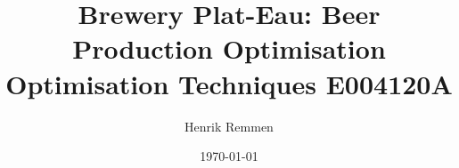 \documentclass[pdftex,10pt,a4paper]{article}
\numberwithin{equation}{section}
\numberwithin{figure}{section}
\numberwithin{table}{section}
\begin{document}
\pagestyle{empty}

\title{\textbf{Brewery Plat-Eau: Beer Production Optimisation}\\
Optimisation Techniques 
E004120A}

\author{Henrik Remmen}
\date{\today}

\maketitle

\newpage
\tableofcontents

\newpage
{}
\setcounter{page}{1}
\pagestyle{fancy}


\FloatBarrier
\newpage


\FloatBarrier
\newpage


\FloatBarrier
\newpage


\FloatBarrier
\newpage


\FloatBarrier
\newpage


\FloatBarrier
\newpage


\FloatBarrier
\newpage


\FloatBarrier
\newpage


\FloatBarrier
\newpage


\FloatBarrier
\newpage


\FloatBarrier


\newpage
{}
\pagestyle{empty}

\nocite{assignment,scipy}



\appendix
\newpage

\end{document}
